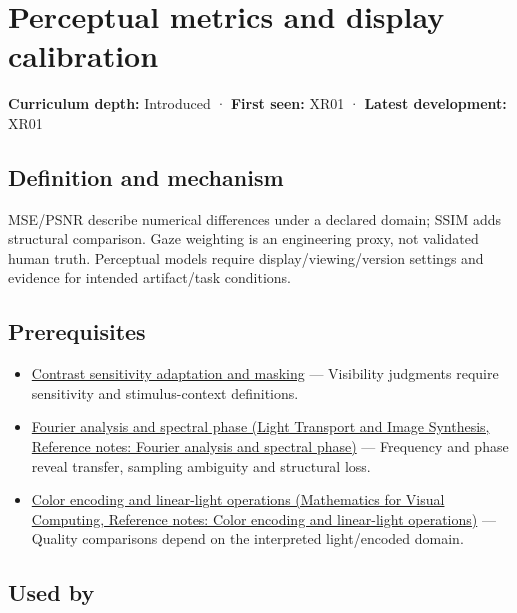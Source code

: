 \hypertarget{appendix-b2c1846508bf}{}\label{referencestart:appendix-b2c1846508bf}
\section{Perceptual metrics and display calibration}\label{appendix-b2c1846508bf-perceptual-metrics-and-display-calibration}

\textbf{Curriculum depth:} Introduced · \textbf{First seen:} XR01 · \textbf{Latest development:} XR01

\subsection{Definition and mechanism}\label{appendix-b2c1846508bf-definition-and-mechanism}

MSE/PSNR describe numerical differences under a declared domain; SSIM adds structural comparison. Gaze weighting is an engineering proxy, not validated human truth. Perceptual models require display/viewing/version settings and evidence for intended artifact/task conditions.

\subsection{Prerequisites}\label{appendix-b2c1846508bf-prerequisites}

\begin{itemize}
\tightlist
\item
  \hyperref[appendix-b3aa9e8e01ad]{Contrast sensitivity adaptation and masking} --- Visibility judgments require sensitivity and stimulus-context definitions.
\item
  \href{../04-Light-Transport-and-Image-Synthesis/main.pdf\#nameddest=appendix-b60686ba06a1}{Fourier analysis and spectral phase (Light Transport and Image Synthesis, Reference notes: Fourier analysis and spectral phase)} --- Frequency and phase reveal transfer, sampling ambiguity and structural loss.
\item
  \href{../02-Mathematics-for-Visual-Computing/main.pdf\#nameddest=appendix-a9f83ad40792}{Color encoding and linear-light operations (Mathematics for Visual Computing, Reference notes: Color encoding and linear-light operations)} --- Quality comparisons depend on the interpreted light/encoded domain.
\end{itemize}

\subsection{Used by}\label{appendix-b2c1846508bf-used-by}

